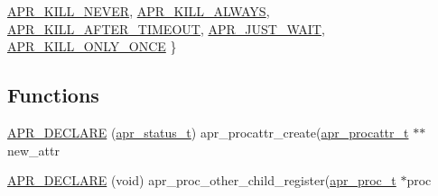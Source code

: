 \begin{DoxyCompactItemize}
\mbox{\hyperlink{group__apr__thread__proc_gga3eaec78633742e7e0cb9480a21477affa33580ab0809e9498855fbdde8a1714ef}{A\+P\+R\+\_\+\+K\+I\+L\+L\+\_\+\+N\+E\+V\+ER}}, 
\mbox{\hyperlink{group__apr__thread__proc_gga3eaec78633742e7e0cb9480a21477affaf45d0f72811399b394d1311384e2dfe4}{A\+P\+R\+\_\+\+K\+I\+L\+L\+\_\+\+A\+L\+W\+A\+YS}}, 
\mbox{\hyperlink{group__apr__thread__proc_gga3eaec78633742e7e0cb9480a21477affa16a47aa786b1c1f31ef02353bcae9a1a}{A\+P\+R\+\_\+\+K\+I\+L\+L\+\_\+\+A\+F\+T\+E\+R\+\_\+\+T\+I\+M\+E\+O\+UT}}, 
\mbox{\hyperlink{group__apr__thread__proc_gga3eaec78633742e7e0cb9480a21477affa6ada2605856ac94826edbe824e64e503}{A\+P\+R\+\_\+\+J\+U\+S\+T\+\_\+\+W\+A\+IT}}, 
\newline
\mbox{\hyperlink{group__apr__thread__proc_gga3eaec78633742e7e0cb9480a21477affa24d6f47785093be4cea2a922eeaed098}{A\+P\+R\+\_\+\+K\+I\+L\+L\+\_\+\+O\+N\+L\+Y\+\_\+\+O\+N\+CE}}
 \}
\end{DoxyCompactItemize}
\subsection*{Functions}
\begin{DoxyCompactItemize}
\item 
\mbox{\hyperlink{group__apr__thread__proc_ga6eb49e8cd31925bd1d170b31cd9e8e08}{A\+P\+R\+\_\+\+D\+E\+C\+L\+A\+RE}} (\mbox{\hyperlink{group__apr__errno_gaf76ee4543247e9fb3f3546203e590a6c}{apr\+\_\+status\+\_\+t}}) apr\+\_\+procattr\+\_\+create(\mbox{\hyperlink{structapr__procattr__t}{apr\+\_\+procattr\+\_\+t}} $\ast$$\ast$new\+\_\+attr
\item 
\mbox{\hyperlink{group__apr__thread__proc_gaf33db61a5a7a12c38e6ae15780eafe00}{A\+P\+R\+\_\+\+D\+E\+C\+L\+A\+RE}} (void) apr\+\_\+proc\+\_\+other\+\_\+child\+\_\+register(\mbox{\hyperlink{structapr__proc__t}{apr\+\_\+proc\+\_\+t}} $\ast$proc
\end{DoxyCompactItemize}
